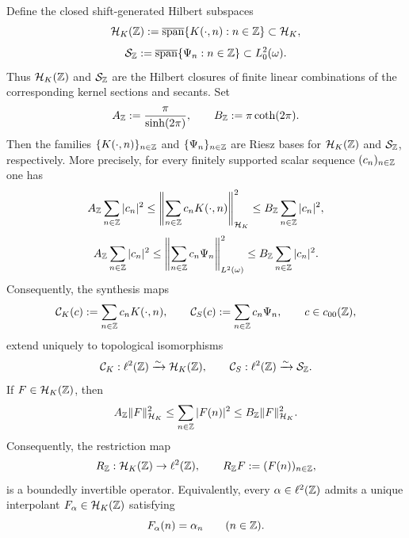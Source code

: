 \begin{theorem}%
\label{thm:poisson-lattice-sampling}
Define the closed shift-generated Hilbert subspaces
\[
\mathcal H_K(\mathbb{Z})
:=
\overline{\operatorname{span}}\{K(\cdot,n):n\in\mathbb{Z}\}
\subset \mathcal H_K,
\]
\[
\mathcal S_{\mathbb{Z}}
:=
\overline{\operatorname{span}}\{\Psi_n:n\in\mathbb{Z}\}
\subset L^2_0(\omega).
\]
Thus $\mathcal H_K(\mathbb{Z})$ and $\mathcal S_{\mathbb{Z}}$ are the Hilbert closures
of finite linear combinations of the corresponding kernel sections and
secants.
Set
\begin{equation}\label{eq:lattice-sampling-constants}
A_{\mathbb{Z}}:=\frac{\pi}{\sinh(2\pi)},
\qquad
B_{\mathbb{Z}}:=\pi\coth(2\pi).
\end{equation}
Then the families $\{K(\cdot,n)\}_{n\in\mathbb{Z}}$ and
$\{\Psi_n\}_{n\in\mathbb{Z}}$ are Riesz bases for
$\mathcal H_K(\mathbb{Z})$ and $\mathcal S_{\mathbb{Z}}$, respectively.  More
precisely, for every
finitely supported scalar sequence $(c_n)_{n\in\mathbb{Z}}$ one has
\begin{equation}\label{eq:lattice-riesz-kernel}
A_{\mathbb{Z}}\sum_{n\in\mathbb{Z}}|c_n|^2
\le
\left\|
\sum_{n\in\mathbb{Z}}c_nK(\cdot,n)
\right\|_{\mathcal H_K}^2
\le
B_{\mathbb{Z}}\sum_{n\in\mathbb{Z}}|c_n|^2,
\end{equation}
\begin{equation}\label{eq:lattice-riesz-secant}
A_{\mathbb{Z}}\sum_{n\in\mathbb{Z}}|c_n|^2
\le
\left\|
\sum_{n\in\mathbb{Z}}c_n\Psi_n
\right\|_{L^2(\omega)}^2
\le
B_{\mathbb{Z}}\sum_{n\in\mathbb{Z}}|c_n|^2.
\end{equation}
Consequently, the synthesis maps
\[
\mathcal C_K(c):=\sum_{n\in\mathbb{Z}}c_nK(\cdot,n),
\qquad
\mathcal C_S(c):=\sum_{n\in\mathbb{Z}}c_n\Psi_n,
\qquad c\in c_{00}(\mathbb{Z}),
\]
extend uniquely to topological isomorphisms
\[
\mathcal C_K:\ell^2(\mathbb{Z})\xrightarrow{\sim}\mathcal H_K(\mathbb{Z}),
\qquad
\mathcal C_S:\ell^2(\mathbb{Z})\xrightarrow{\sim}\mathcal S_{\mathbb{Z}}.
\]
If $F\in\mathcal H_K(\mathbb{Z})$, then
\begin{equation}\label{eq:lattice-sampling-HK}
A_{\mathbb{Z}}\|F\|_{\mathcal H_K}^2
\le
\sum_{n\in\mathbb{Z}}|F(n)|^2
\le
B_{\mathbb{Z}}\|F\|_{\mathcal H_K}^2.
\end{equation}
Consequently, the restriction map
\[
R_{\mathbb{Z}}:\mathcal H_K(\mathbb{Z})\to \ell^2(\mathbb{Z}),
\qquad
R_{\mathbb{Z}}F:=(F(n))_{n\in\mathbb{Z}},
\]
is a boundedly invertible operator.  Equivalently, every
$\alpha\in\ell^2(\mathbb{Z})$ admits a unique interpolant
$F_\alpha\in\mathcal H_K(\mathbb{Z})$ satisfying
\[
F_\alpha(n)=\alpha_n
\qquad(n\in\mathbb{Z}).
\]
\end{theorem}

